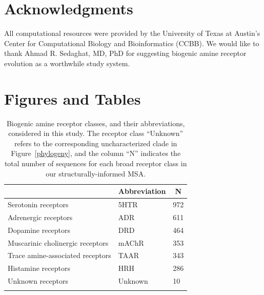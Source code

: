 \documentclass[fleqn,10pt]{wlpeerj}
\begin{document}
\section*{Acknowledgments}
All computational resources were provided by the University of Texas at Austin's Center for Computational Biology and Bioinformatics (CCBB). We would like to thank Ahmad R. Sedaghat, MD, PhD for suggesting biogenic amine receptor evolution as a worthwhile study system.

\newpage



\newpage


\section*{Figures and Tables}


\vspace*{5cm}


\begin{table}[htbp]
	\centering
	\begin{tabular}{l l l}
		\hline\noalign{\smallskip}
		\multicolumn{1}{c}{Receptor Class} & \multicolumn{1}{c}{Abbreviation} & \multicolumn{1}{c}{N} \\
		\hline\noalign{\smallskip}
		Serotonin receptors & \quad 5HTR & 972  \\
		Adrenergic receptors & \quad ADR & 611  \\
		Dopamine receptors & \quad DRD & 464 \\
		Muscarinic cholinergic receptors & \quad mAChR & 353  \\
		Trace amine-associated receptors & \quad TAAR & 343 \\
		Histamine receptors & \quad HRH & 286 \\
		Unknown receptors & \quad Unknown & 10 \\
		\noalign{\smallskip}\hline\noalign{\smallskip} 
	\end{tabular}
	\caption{\label{tab:abbrev_count} Biogenic amine receptor classes, and their abbreviations, considered in this study. The receptor class ``Unknown'' refers to the corresponding uncharacterized clade in Figure~\ref{phylogeny}, and the column ``N'' indicates the total number of sequences for each broad receptor class in our structurally-informed MSA.}
\end{table}




\newpage
\end{document}
